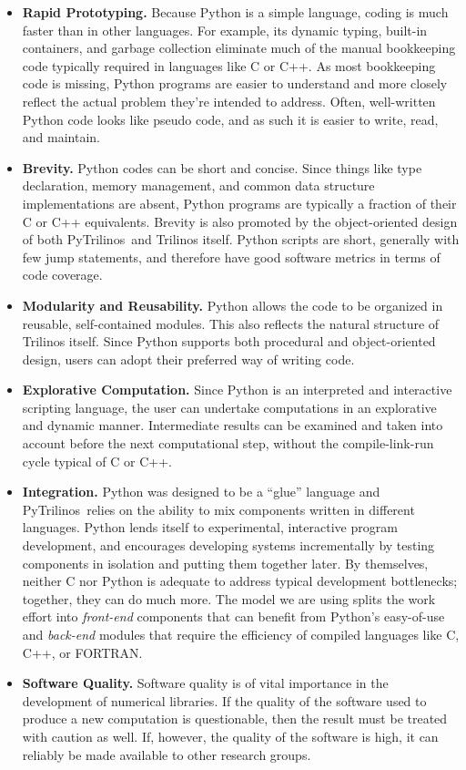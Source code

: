 \documentclass{llncs}
\newcommand{\PyTrilinos}{{\sc PyTrilinos}}
\begin{document}
\begin{itemize}
%
\item {\bf Rapid Prototyping.}  Because Python is a simple language,
  coding is much faster than in other languages.  For example, its
  dynamic typing, built-in containers, and garbage collection
  eliminate much of the manual bookkeeping code typically required in
  languages like C or C++.  As most bookkeeping code is missing,
  Python programs are easier to understand and more closely reflect
  the actual problem they're intended to address.  Often, well-written
  Python code looks like pseudo code, and as such it is easier to
  write, read, and maintain.
%
\item {\bf Brevity.} Python codes can be short and concise.  Since
  things like type declaration, memory management, and common data
  structure implementations are absent, Python programs are typically
  a fraction of their C or C++ equivalents.  Brevity is also promoted
  by the object-oriented design of both \PyTrilinos\ and Trilinos
  itself.  Python scripts are short, generally with few jump
  statements, and therefore have good software metrics in terms of
  code coverage.
%
\item {\bf Modularity and Reusability.} Python allows the code to be organized in
  reusable, self-contained modules.  This also reflects the natural
  structure of Trilinos itself.  Since Python supports both procedural
  and object-oriented design, users can adopt their preferred way of
  writing code.
%
\item {\bf Explorative Computation.} Since Python is an interpreted
  and interactive scripting language, the user can undertake
  computations in an explorative and dynamic manner.  Intermediate
  results can be examined and taken into account before the next
  computational step, without the compile-link-run cycle typical of C
  or C++.
%
\item {\bf Integration.} Python was designed to be a ``glue'' language
  and \PyTrilinos\ relies on the ability to mix components written in
  different languages.  Python lends itself to experimental,
  interactive program development, and encourages developing systems
  incrementally by testing components in isolation and putting them
  together later.  By themselves, neither C nor Python is adequate to
  address typical development bottlenecks; together, they can do much
  more.  The model we are using splits the work effort into {\sl
    front-end} components that can benefit from Python's easy-of-use
  and {\sl back-end} modules that require the efficiency of compiled
  languages like C, C++, or FORTRAN.
%
\item {\bf Software Quality.} Software quality is of vital importance
  in the development of numerical libraries.  If the quality of the
  software used to produce a new computation is questionable, then the
  result must be treated with caution as well.  If, however, the
  quality of the software is high, it can reliably be made available
  to other research groups.


\end{itemize}
\end{document}
